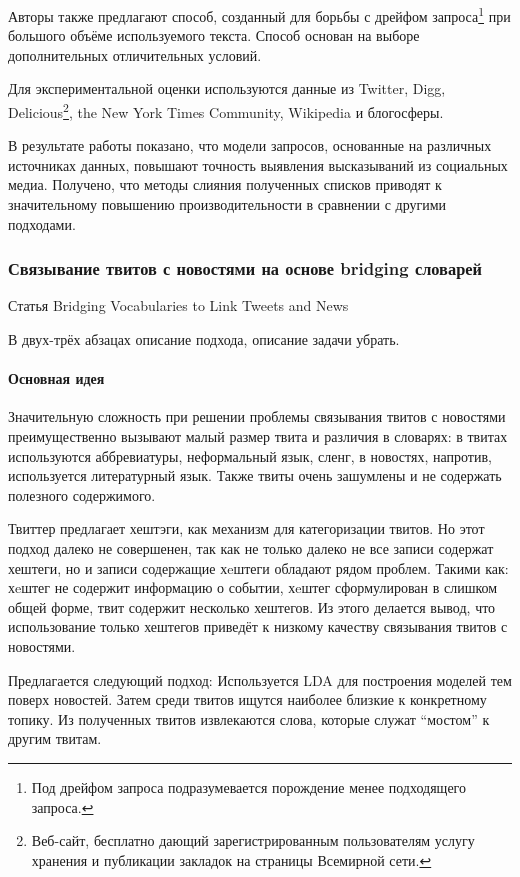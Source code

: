         Авторы также предлагают способ, созданный для борьбы с дрейфом запроса\footnote{Под дрейфом запроса подразумевается порождение менее подходящего запроса.} при большого объёме используемого текста.
        Способ основан на выборе дополнительных отличительных условий.

        Для экспериментальной оценки используются данные из Twitter, Digg, Delicious\footnote{Веб-сайт, бесплатно дающий зарегистрированным пользователям услугу хранения и публикации закладок на страницы Всемирной сети.}, the New York Times Community, Wikipedia и блогосферы.

        В результате работы показано, что модели запросов, основанные на различных источниках данных, повышают точность выявления высказываний из социальных медиа. Получено, что методы слияния полученных списков приводят к значительному повышению производительности в сравнении с другими подходами.

    \subsubsection{Связывание твитов с новостями на основе bridging словарей}
        Статья Bridging Vocabularies to Link Tweets and News

        В двух-трёх абзацах описание подхода, описание задачи убрать.

        \paragraph{Основная идея}
            Значительную сложность при решении проблемы связывания твитов с новостями преимущественно вызывают малый размер твита и различия в словарях: в твитах используются аббревиатуры, неформальный язык, сленг, в новостях, напротив, используется литературный язык. Также твиты очень зашумлены и не содержать полезного содержимого.

            Твиттер предлагает хештэги, как механизм для категоризации твитов. Но этот подход далеко не совершенен, так как не только далеко не все записи содержат хештеги, но и записи содержащие хeштеги обладают рядом проблем. Такими как: хeштег не содержит информацию о событии, хeштег сформулирован в слишком общей форме, твит содержит несколько хештегов. Из этого делается вывод, что использование только хештегов приведёт к низкому качеству связывания твитов с новостями.

            Предлагается следующий подход:
            Используется LDA для построения моделей тем поверх новостей. Затем среди твитов ищутся наиболее близкие к конкретному топику. Из полученных твитов извлекаются слова, которые служат ``мостом'' к другим твитам.

